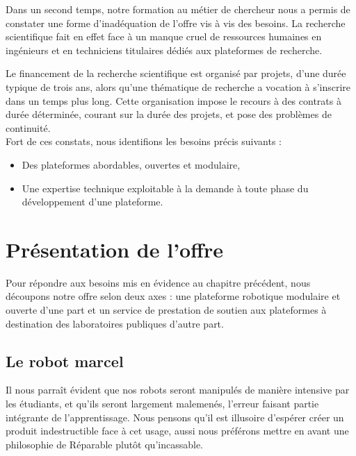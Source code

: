 \documentclass[a4paper,12pt]{report}
\begin{document}
Dans un second temps, notre formation au métier de chercheur nous a permis de constater une forme d'inadéquation de l'offre vis à vis des besoins.
La recherche scientifique fait en effet face à un manque cruel de ressources humaines en ingénieurs et en techniciens titulaires dédiés aux plateformes de recherche.

Le financement de la recherche scientifique est organisé par projets, d'une durée typique de trois ans, alors qu'une thématique de recherche a vocation à s'inscrire dans un temps plus long.
Cette organisation impose le recours à des contrats à durée déterminée, courant sur la durée des projets, et pose des problèmes de continuité.\\

Fort de ces constats, nous identifions les besoins précis suivants :
\begin{itemize}
	\item Des plateformes abordables, ouvertes et modulaire,
	\item Une expertise technique exploitable à la demande à toute phase du développement d'une plateforme.
\end{itemize}

\section{Présentation de l'offre}
Pour répondre aux besoins mis en évidence au chapitre précédent, nous découpons notre offre selon deux axes :
une plateforme robotique modulaire et ouverte d'une part et un service de prestation de soutien aux plateformes à destination des laboratoires publiques d'autre part.
\subsection{Le robot marcel}
Il nous parraît évident que nos robots seront manipulés de manière intensive par les étudiants, et qu'ils seront largement malemenés, l'erreur faisant partie intégrante de l'apprentissage.
Nous pensons qu'il est illusoire d'espérer créer un produit indestructible face à cet usage, aussi nous préférons mettre en avant une philosophie de \og{}Réparable plutôt qu'incassable\fg{}.
\end{document}
